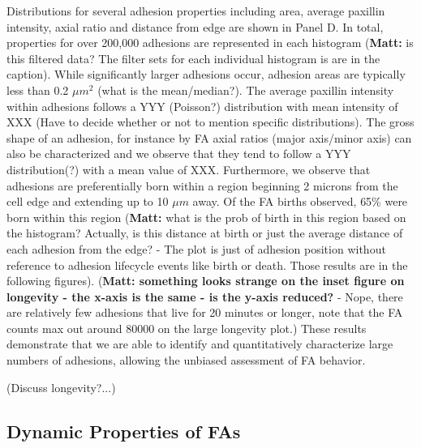 \documentclass[10pt]{article}
\begin{document}
Distributions for several adhesion properties including area, average paxillin
intensity, axial ratio and distance from edge are shown in Panel D. In total,
properties for over 200,000 adhesions are represented in each histogram
(\textbf{Matt:} is this filtered data? The filter sets for each individual
histogram is are in the caption). While significantly larger adhesions occur,
adhesion areas are typically less than 0.2 $\mu m^2$ (what is the mean/median?).
The average paxillin intensity within adhesions follows a YYY (Poisson?)
distribution with mean intensity of XXX (Have to decide whether or not to
mention specific distributions). The gross shape of an adhesion, for instance by
FA axial ratios (major axis/minor axis) can also be characterized and we observe
that they tend to follow a YYY distribution(?) with a mean value of XXX.
Furthermore, we observe that adhesions are preferentially born within a region
beginning 2 microns from the cell edge and extending up to 10 $\mu m$ away. Of
the FA births observed, 65\% were born within this region (\textbf{Matt:} what
is the prob of birth in this region based on the histogram? Actually, is this
distance at birth or just the average distance of each adhesion from the edge? -
The plot is just of adhesion position without reference to adhesion lifecycle
events like birth or death. Those results are in the following figures).
(\textbf{Matt: something looks strange on the inset figure on longevity - the
x-axis is the same - is the y-axis reduced?} - Nope, there are relatively few
adhesions that live for 20 minutes or longer, note that the FA counts max out
around 80000 on the large longevity plot.) These results demonstrate that we are
able to identify and quantitatively characterize large numbers of adhesions,
allowing the unbiased assessment of FA behavior.

(Discuss longevity?...)

\subsection*{Dynamic Properties of FAs}
\end{document}

